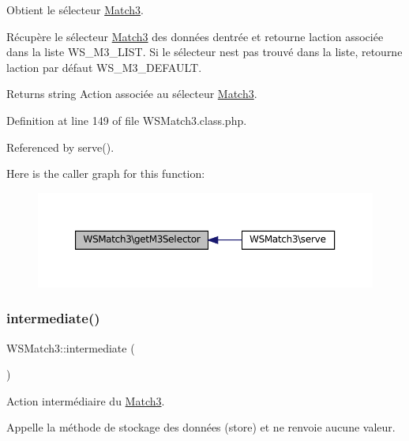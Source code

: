 Obtient le sélecteur \hyperlink{class_match3}{Match3}.

Récupère le sélecteur \hyperlink{class_match3}{Match3} des données d\textquotesingle{}entrée et retourne l\textquotesingle{}action associée dans la liste W\+S\+\_\+\+M3\+\_\+\+L\+I\+ST. Si le sélecteur n\textquotesingle{}est pas trouvé dans la liste, retourne l\textquotesingle{}action par défaut W\+S\+\_\+\+M3\+\_\+\+D\+E\+F\+A\+U\+LT.

\begin{DoxyReturn}{Returns}
string Action associée au sélecteur \hyperlink{class_match3}{Match3}. 
\end{DoxyReturn}


Definition at line 149 of file W\+S\+Match3.\+class.\+php.



Referenced by serve().

Here is the caller graph for this function\+:\nopagebreak
\begin{figure}[H]
\begin{center}
\leavevmode
\includegraphics[width=350pt]{class_w_s_match3_aa38859d7b938a1a463f5f71fa9158f18_icgraph}
\end{center}
\end{figure}
\mbox{\label{class_w_s_match3_afbcd987857d22156e83f94015f6be8ad}} 
\subsubsection{\texorpdfstring{intermediate()}{intermediate()}}
{\footnotesize\ttfamily W\+S\+Match3\+::intermediate (\begin{DoxyParamCaption}{ }\end{DoxyParamCaption})\hspace{0.3cm}{\ttfamily [protected]}}

Action intermédiaire du \hyperlink{class_match3}{Match3}.

Appelle la méthode de stockage des données (store) et ne renvoie aucune valeur.

